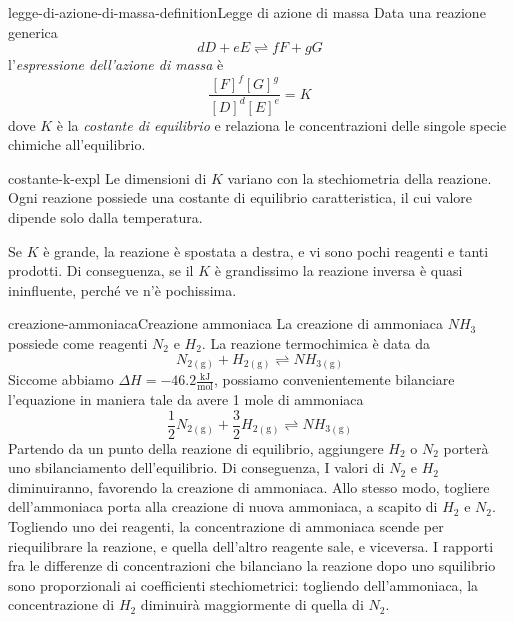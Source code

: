 \documentclass[preview]{standalone}
\begin{document}

\begin{snippetdefinition}{legge-di-azione-di-massa-definition}{Legge di azione di massa}
    Data una reazione generica
    \[
        dD + eE \rightleftharpoons fF + gG
    \]
    l'\textit{espressione dell'azione di massa} è
    \[ \frac{{[F]}^f{[G]}^g}{{[D]}^d{[E]}^e} = K \]
    dove \(K\)  è la \textit{costante di equilibrio} e relaziona
    le concentrazioni delle singole specie chimiche all'equilibrio.
\end{snippetdefinition}

\begin{snippet}{costante-k-expl}
    Le dimensioni di \(K\) variano con la stechiometria della reazione.\\
Ogni reazione possiede una costante di equilibrio caratteristica,
il cui valore dipende solo dalla temperatura.

Se \(K\) è grande, la reazione è spostata a destra,
e vi sono pochi reagenti e tanti prodotti.
Di conseguenza, se il \(K\) è grandissimo la reazione inversa è quasi
ininfluente, perché ve n'è pochissima.
\end{snippet}

\begin{snippetexample}{creazione-ammoniaca}{Creazione ammoniaca}
    La creazione di ammoniaca \(NH_3\) possiede come reagenti \(N_2\) e \(H_2\).
    La reazione termochimica è data da
    \[
        N_{2(\text{g})} + H_{2(\text{g})}   \rightleftharpoons NH_{3(\text{g})}      
    \]
    Siccome abbiamo \(\Delta H = -46.2 \frac{\text{kJ}}{\text{mol}}\),
    possiamo convenientemente bilanciare l'equazione in maniera tale da avere 1 mole di ammoniaca
    \[
        \frac{1}{2}N_{2(\text{g})} + \frac{3}{2}H_{2(\text{g})}   \rightleftharpoons NH_{3(\text{g})}
    \]
    Partendo da un punto della reazione di equilibrio,
    aggiungere \(H_2\) o \(N_2\) porterà uno sbilanciamento dell'equilibrio.
    Di conseguenza,
    I valori di \(N_2\) e \(H_2\) diminuiranno, favorendo la creazione di ammoniaca.
    Allo stesso modo, togliere dell'ammoniaca porta alla creazione di nuova ammoniaca, a scapito
    di \(H_2\) e \(N_2\).
    Togliendo uno dei reagenti, la concentrazione di ammoniaca scende per riequilibrare la reazione,
    e quella dell'altro reagente sale, e viceversa.
    I rapporti fra le differenze di concentrazioni che bilanciano la reazione dopo
    uno squilibrio sono proporzionali ai coefficienti stechiometrici:
    togliendo dell'ammoniaca, la concentrazione di \(H_2\) diminuirà maggiormente di quella di \(N_2\).
\end{snippetexample}
\end{document}
